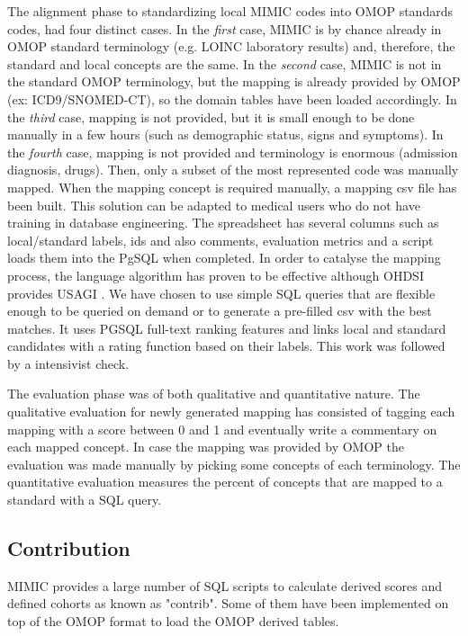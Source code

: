 The alignment phase to standardizing local MIMIC codes into OMOP standards
codes, had four distinct cases. In the \emph{first} case, MIMIC is by chance
already in OMOP standard terminology (e.g. LOINC laboratory results) and,
therefore, the standard and local concepts are the same. In the \emph{second}
case, MIMIC is not in the standard OMOP terminology, but the mapping is already
provided by OMOP (ex: ICD9/SNOMED-CT), so the domain tables have been loaded
accordingly.  In the \emph{third} case, mapping is not provided, but it is
small enough to be done manually in a few hours (such as demographic status,
signs and symptoms). In the \emph{fourth} case, mapping is not provided and
terminology is enormous (admission diagnosis, drugs). Then, only a subset of
the most represented code was manually mapped.
When the mapping concept is required manually, a mapping csv file has been
built.  This solution can be adapted to medical users who do not have training
in database engineering. The spreadsheet has several columns such as
local/standard labels, ids and also comments, evaluation metrics and a script
loads them into the PgSQL when completed. In order to catalyse the mapping
process, the language algorithm has proven to be effective
\cite{schema-matching} although OHDSI provides USAGI \cite{usagi}. We have
chosen to use simple SQL queries that are flexible enough to be queried on
demand or to generate a pre-filled csv with the best matches. It uses PGSQL
full-text ranking features  and links local and standard candidates with a
rating function based on their labels. This work was followed by a intensivist
check.

The evaluation phase was of both qualitative and quantitative nature.
The qualitative evaluation for newly generated mapping has consisted of tagging
each mapping with a score between 0 and 1 and eventually write a commentary on
each mapped concept. In case the mapping was provided by OMOP the evaluation
was made manually by picking some concepts of each terminology.
The quantitative evaluation measures the percent of concepts that are mapped to
a standard with a SQL query.

%
%
\subsection{Contribution}

MIMIC provides a large number of SQL scripts to calculate derived scores and
defined cohorts as known as "contrib". Some of them have been implemented on
top of the OMOP format to load the OMOP derived tables. 

